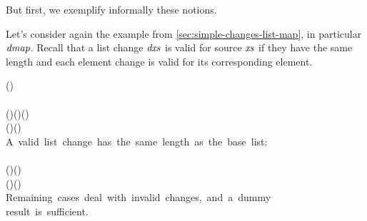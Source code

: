 But first, we exemplify informally these notions.
\begin{example}
  \label{ex:syn-changes-map}
Let's consider again the example from
\cref{sec:simple-changes-list-map}, in particular \ensuremath{\Varid{dmap}}.
Recall that a list change \ensuremath{\Varid{dxs}} is valid for source \ensuremath{\Varid{xs}} if
they have the same length and each element change is valid for
its corresponding element.

\begin{hscode}\SaveRestoreHook
{}%
%
%
\>[B]{}\typcolon(\to {})\to {}\;\to {}\;\<[E]%
\\
\>[B]{}\;\;\mathrel{=}\<[E]%
\\
\>[B]{}\;\;(\;\;)\mathrel{=}\;(\;)\;(\;\;){}\<[E]%
\\[\blanklineskip]%
\>[B]{}\typcolon(\to {})\to \Delta (\to {})\to {}\;\to \Delta {}\;\to \Delta {}\;\<[E]%
\\
\>[B]{}\mbox{\onelinecomment  A valid list change has the same length as the base list:}{}\<[E]%
\\
\>[B]{}\;\;\;\;\mathrel{=}\<[E]%
\\
\>[B]{}\;\;\;(\;\;)\;(\;\;)\mathrel{=}{}\<[E]%
\\
\>[B]{}\<[3]%
\>[3]{}\;(\;\;)\;(\;\;\;\;){}\<[E]%
\\
\>[B]{}\mbox{\onelinecomment  Remaining cases deal with invalid changes, and a dummy}{}\<[E]%
\\
\>[B]{}\mbox{\onelinecomment  result is sufficient.}{}\<[E]%
\\
\>[B]{}\;\;\;\;\mathrel{=}\<[E]%
\ColumnHook
\end{hscode}\resethooks
\end{example}


